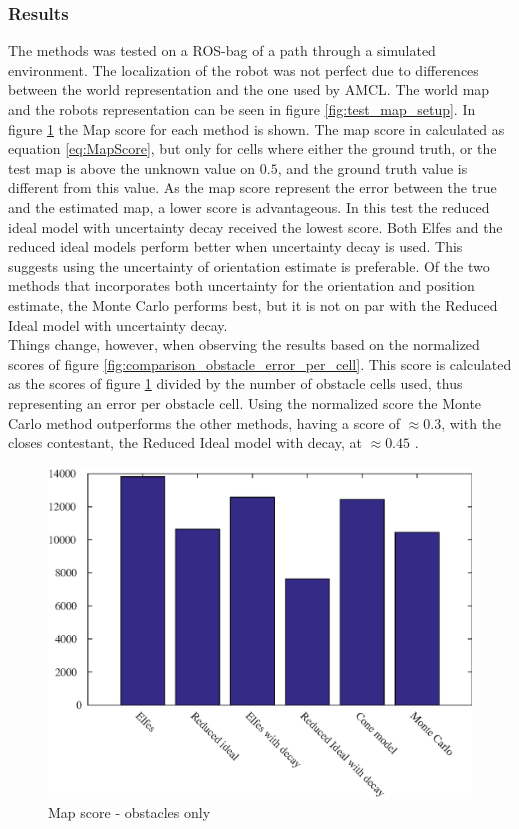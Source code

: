 \subsubsection{Results}
The methods was tested on a ROS-bag of a path through a simulated environment. 
The localization of the robot was not perfect due to differences between the world representation and the one used by AMCL.
The world map and the robots representation can be seen in figure \ref{fig:test_map_setup}.
In figure \ref{fig:comparison_obstacle_error} the Map score for each method is shown. The map score in calculated as equation \ref{eq:MapScore}, but only for cells where either the ground truth, or the test map is above the unknown value on $0.5$, and the ground truth value is different from this value. As the map score represent the error between the true and the estimated map, a lower score is advantageous. In this test the reduced ideal model with uncertainty decay received the lowest score. Both Elfes and the reduced ideal models perform better when uncertainty decay is used. This suggests using the uncertainty of orientation estimate is preferable. Of the two methods that incorporates both uncertainty for the orientation and position estimate, the Monte Carlo performs best, but it is not on par with the Reduced Ideal model with uncertainty decay.\\
 
Things change, however, when observing the results based on the normalized scores of figure \ref{fig:comparison_obstacle_error_per_cell}. This score is calculated as the scores of figure \ref{fig:comparison_obstacle_error} divided by the number of obstacle cells used, thus representing an error per obstacle cell.
Using the normalized score the Monte Carlo method outperforms the other methods, having a score of \(\approx 0.3\), with the closes contestant, the Reduced Ideal model with decay, at \(\approx 0.45\) .\\

\begin{figure}
	\centering
	\includegraphics[scale=1]{figures/static_mapping/comparison_obstacle_error}
	\caption{Map score - obstacles only}
	\label{fig:comparison_obstacle_error}
\end{figure}

